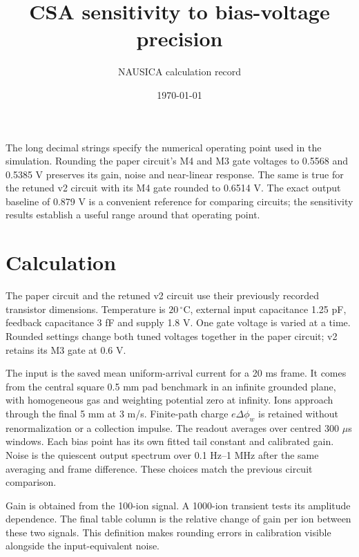 \documentclass[11pt,a4paper]{article}
\title{CSA sensitivity to bias-voltage precision}
\author{NAUSICA calculation record}\date{\today}
\begin{document}
\maketitle
The long decimal strings specify the numerical operating point used in the
simulation. Rounding the paper circuit's M4 and M3 gate voltages to
0.5568 and 0.5385 V preserves its gain, noise and near-linear response.
The same is true for the retuned v2 circuit with its M4 gate rounded to
0.6514 V. The exact output baseline of 0.879 V is a convenient reference
for comparing circuits; the sensitivity results establish a useful range
around that operating point.

\section*{Calculation}
The paper circuit and the retuned v2 circuit use their previously recorded
transistor dimensions. Temperature is $20\,^{\circ}$C, external input
capacitance 1.25 pF, feedback capacitance 3 fF and supply 1.8 V. One gate
voltage is varied at a time. Rounded settings change both tuned voltages
together in the paper circuit; v2 retains its M3 gate at 0.6 V.

The input is the saved mean uniform-arrival current for a 20 ms frame.
It comes from the central square 0.5 mm pad benchmark in an infinite
grounded plane, with homogeneous gas and weighting potential zero at
infinity. Ions approach through the final 5 mm at 3 m/s. Finite-path charge
$e\Delta\phi_w$ is retained without renormalization or a collection impulse.
The readout averages over centred 300 $\mu$s windows. Each bias point has
its own fitted tail constant and calibrated gain. Noise is the quiescent
output spectrum over 0.1 Hz--1 MHz after the same averaging and frame
difference. These choices match the previous circuit comparison.

Gain is obtained from the 100-ion signal. A 1000-ion transient tests its
amplitude dependence. The final table column is the relative change of
gain per ion between these two signals. This definition makes rounding
errors in calibration visible alongside the input-equivalent noise.
\end{document}
